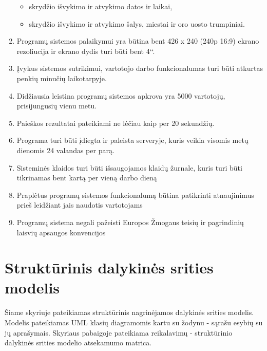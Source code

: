 \documentclass{VUMIFPSkursinis}
\begin{document}
\begin{enumerate}[label=\textbf{NFR\arabic*}.]
\begin{itemize}
                    	\item skrydžio išvykimo ir atvykimo datos ir laikai,
                    	\item skrydžio išvykimo ir atvykimo šalys, miestai ir oro uosto trumpiniai.
                    \end{itemize}
                    \item Programų sistemos palaikymui yra būtina bent 426 x 240 (240p 16:9) ekrano rezoliucija ir ekrano dydis turi būti bent 4‘‘.
                    \item Įvykus sistemos sutrikimui, vartotojo darbo funkcionalumas turi būti atkurtas penkių minučių laikotarpyje.
                    \item Didžiausia leistina programų sistemos apkrova yra 5000 vartotojų, prisijungusių vienu metu.
                    \item Paieškos rezultatai pateikiami ne lėčiau kaip per 20 sekundžių.
                    \item Programa turi būti įdiegta ir paleista serveryje, kuris veikia visomis metų dienomis 24 valandas per parą.
                    \item Sisteminės klaidos turi būti išsaugojamos klaidų žurnale, kuris turi būti tikrinamas bent kartą per vieną darbo dieną
                    \item Praplėtus programų sistemos funkcionalumą būtina patikrinti atnaujinimus prieš leidžiant jais naudotis vartotojams
                    \item Programų sistema negali pažeisti Europos Žmogaus teisių ir pagrindinių laisvių apsaugos konvencijos
                \end{enumerate}
      
        \section{Struktūrinis dalykinės srities modelis}
            Šiame skyriuje pateikiamas struktūrinis nagrinėjamos dalykinės srities modelis. Modelis pateikiamas UML klasių diagramomis kartu su žodynu - sąrašu esybių su jų aprašymais. Skyriaus pabaigoje pateikiama reikalavimų - struktūrinio dalykinės srities modelio atsekamumo matrica.
\end{document}
